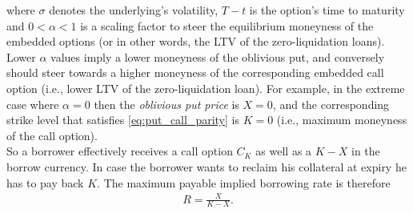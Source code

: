 \documentclass[a4paper]{article}
\begin{document}
where $\sigma$ denotes the underlying's volatility, $T-t$ is the option's time to maturity and $0<\alpha<1$ is a scaling factor to steer the equilibrium moneyness of the embedded options (or in other words, the LTV of the zero-liquidation loans). Lower $\alpha$ values imply a lower moneyness of the oblivious put, and conversely should steer towards a higher moneyness of the corresponding embedded call option (i.e., lower LTV of the zero-liquidation loan). For example, in the extreme case where $\alpha=0$ then the \emph{oblivious put price} is $X=0$, and the corresponding strike level that satisfies \cref{eq:put_call_parity} is $K=0$ (i.e., maximum moneyness of the call option).\\

So a borrower effectively receives a call option $C_K$ as well as a $K-X$ in the borrow currency. In case the borrower wants to reclaim his collateral at expiry he has to pay back $K$. The maximum payable implied borrowing rate is therefore
\begin{equation}
\begin{split}
R = \frac{X}{K-X}.
\end{split}
\end{equation}


\end{document}
